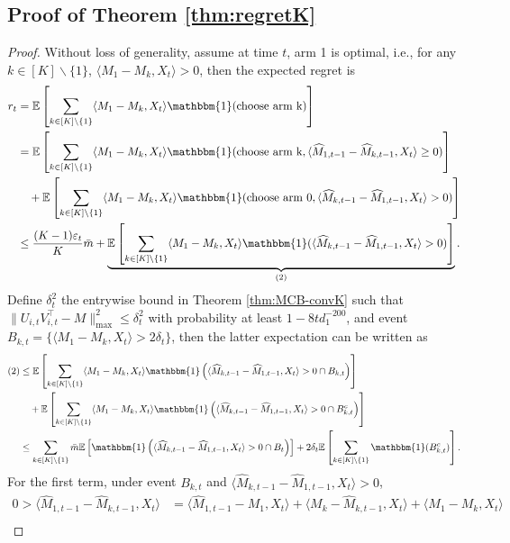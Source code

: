 \documentclass[12pt]{article}
\newcommand{\inp}[2]{\langle #1,#2\rangle}
\def\EE{{\mathbb E}}
\theoremstyle{plain}
\begin{document}
\subsection{Proof of Theorem \ref{thm:regretK}}\label{sec:proofregretK}
\begin{proof}
Without loss of generality, assume at time $t$, arm 1 is optimal, i.e., for any $k\in [K]\backslash \{1\}$, $\inp{M_1-M_k}{X_t}>0$, then the expected regret is
\begin{align*}
    r_t&=\EE\left[\sum_{k\in [K]\backslash \{1\}} \inp{M_1-M_k}{X_t}\mathbbm{1}(\text{choose arm k}) \right] \\
    &= \EE\left[\sum_{k\in [K]\backslash \{1\}} \inp{M_1-M_k}{X_t}\mathbbm{1}(\text{choose arm k}, \inp{\widehat{M}_{1,t-1}-\widehat{M}_{k,t-1}}{X_t}\geq 0)\right] \\ &\quad + \EE\left[\sum_{k\in [K]\backslash \{1\}}\inp{M_1-M_k}{X_t}\mathbbm{1}(\text{choose arm 0}, \inp{\widehat{M}_{k,t-1}-\widehat{M}_{1,t-1}}{X_t}> 0)\right] \\
    &\leq \frac{(K-1)\varepsilon_t}{K}\bar{m} + \underbrace{\EE\left[\sum_{k\in [K]\backslash \{1\}} \inp{M_1-M_k}{X_t}\mathbbm{1}(\inp{\widehat{M}_{k,t-1}-\widehat{M}_{1,t-1}}{X_t}> 0)\right]}_{(2)}.
\end{align*}
Define $\delta_t^2$ the entrywise bound in Theorem \ref{thm:MCB-convK} such that $\|U_{i,t}V_{i,t}^{\top} - M\|_{\max}^2\leq \delta_t^2$ with probability at least $1-8td_1^{-200}$, and event $B_{k,t}=\{\inp{M_1-M_k}{X_t}>2\delta_t\}$, then the latter expectation can be written as
\begin{align*}
    (2)&\leq \EE\left[\sum_{k\in [K]\backslash \{1\}} \inp{M_1-M_k}{X_t}\mathbbm{1}\left(\inp{\widehat{M}_{k,t-1}-\widehat{M}_{1,t-1}}{X_t}> 0\cap B_{k,t}\right)\right] \\ &\quad + \EE\left[\sum_{k\in [K]\backslash \{1\}} \inp{M_1-M_k}{X_t}\mathbbm{1}\left(\inp{\widehat{M}_{k,t-1}-\widehat{M}_{1,t-1}}{X_t}> 0\cap B_{k,t}^c\right)\right] \\
    &\leq \sum_{k\in [K]\backslash \{1\}}\bar{m} \EE\left[\mathbbm{1}\left(\inp{\widehat{M}_{k,t-1}-\widehat{M}_{1,t-1}}{X_t}> 0\cap B_t\right)\right] + 2\delta_t\EE\left[\sum_{k\in [K]\backslash \{1\}} \mathbbm{1}(B_{k,t}^c)\right].
\end{align*}
For the first term, under event $B_{k,t}$ and $\inp{\widehat{M}_{k,t-1}-\widehat{M}_{1,t-1}}{X_t}> 0$, 
\begin{align*}
    0>\inp{\widehat{M}_{1,t-1}-\widehat{M}_{k,t-1}}{X_t} &= \inp{\widehat{M}_{1,t-1}-M_1}{X_t} + \inp{M_k-\widehat{M}_{k,t-1}}{X_t} + \inp{M_1-M_k}{X_t}\\

\end{align*}
\end{proof}
\end{document}
